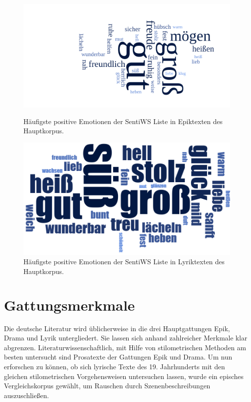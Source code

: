 \documentclass[a4paper,10p]{article}
\begin{document}
\begin{figure}[h]
	\centering
	\begin{minipage}[b]{.45\linewidth}
		\centering
		\includegraphics[width=\linewidth]{haupt_epik_wordcloud_pos}
				\caption{Häufigste positive Emotionen der SentiWS Liste in Epiktexten des Hauptkorpus.}
					\label{fig:sentiwsepik_cloud}
	\end{minipage}
	\hfill
	\begin{minipage}[b]{.45\linewidth}
		\centering
		\includegraphics[width=\linewidth]{haupt_lyrik_wordcloud_pos}
			\caption{Häufigste positive Emotionen der SentiWS Liste in Lyriktexten des Hauptkorpus.}
				\label{fig:sentiwslyrik_cloud}
	\end{minipage}
\end{figure}



\section{Gattungsmerkmale}
Die deutsche Literatur wird üblicherweise in die drei Hauptgattungen Epik, Drama und Lyrik untergliedert. Sie lassen sich anhand zahlreicher Merkmale klar abgrenzen. Literaturwissenschaftlich, mit Hilfe von stilometrischen Methoden am besten untersucht sind Prosatexte der Gattungen Epik und Drama. Um nun erforschen zu können, ob sich lyrische Texte des 19. Jahrhunderts mit den gleichen stilometrischen Vorgehensweisen untersuchen lassen, wurde ein episches Vergleichskorpus gewählt, um Rauschen durch Szenenbeschreibungen auszuschließen. \par 
\end{document}
